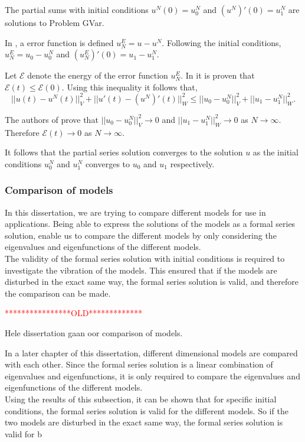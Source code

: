 \documentclass[../../main.tex]{subfiles}
\begin{document}
The partial sums with initial conditions $u^N(0) = u^N_0$ and $(u^N)'(0) = u^N_1$ are solutions to Problem GVar.

In \cite{CVV18}, a error function is defined $u^E_N = u - u^N$. Following the initial conditions, $u^E_N = u_0 - u^N_0$ and $(u^E_N)'(0) = u_1 - u^N_1$.

Let $\mathcal{E}$ denote the energy of the error function $u^E_N$. In \cite{CVV18} it is proven that $\mathcal{E}(t) \leq \mathcal{E}(0)$. Using this inequality it follows that, \[||u(t) -  u^N(t)||_V^2 + ||u'(t) - (u^N)'(t)||^2_W \leq ||u_0 - u^N_0||_V^2 + ||u_1 - u^N_1||_W^2. \]

The authors of \cite{CVV18} prove that $||u_0 - u^N_0||_V^2 \rightarrow 0$ and $||u_1 - u^N_1||_W^2 \rightarrow 0$ as $N \rightarrow \infty$. Therefore $\mathcal{E}(t) \rightarrow 0$ as $N \rightarrow \infty$.

It follows that the partial series solution converges to the solution $u$ as the initial conditions $u_0^N$ and $u_1^N$ converges to $u_0$ and $u_1$ respectively.


\subsubsection{Comparison of models}
In this dissertation, we are trying to compare different models for use in applications. Being able to express the solutions of the models as a formal series solution, enable us to compare the different models by only considering the eigenvalues and eigenfunctions of the different models.\\

The validity of the formal series solution with initial conditions is required to investigate the vibration of the models. This ensured that if the models are disturbed in the exact same way, the formal series solution is valid, and therefore the comparison can be made.


\textcolor{red}{****************OLD*************}

Hele dissertation gaan oor comparison of models.


In a later chapter of this dissertation, different dimensional models are compared with each other. Since the formal series solution is a linear combination of eigenvalues and eigenfunctions, it is only required to compare the eigenvalues and eigenfunctions of the different models.\\

Using the results of this subsection, it can be shown that for specific initial conditions, the formal series solution is valid for the different models. So if the two models are disturbed in the exact same way, the formal series solution is valid for b
\end{document}
